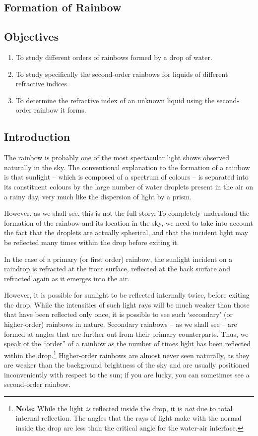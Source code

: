 \begin{refsection}
\chapter{Formation of Rainbow}

\section*{Objectives}

\begin{enumerate}
\item To study different orders of rainbows formed by a drop of water.
\item To study specifically the second-order rainbows for liquids of different refractive indices.
\item To determine the refractive index of an unknown liquid using the second-order rainbow it forms.
\end{enumerate}


\section*{Introduction}
The rainbow is probably one of the most spectacular light shows observed naturally in the sky. The conventional explanation to the formation of a rainbow is that sunlight -- which is composed of a spectrum of colours -- is separated into its constituent colours by the large number of water droplets present in the air on a rainy day, very much like the dispersion of light by a prism. 

However, as we shall see, this is not the full story. To completely understand the formation of the rainbow and its location in the sky, we need to take into account the fact that the droplets are actually spherical, and that the incident light may be reflected many times within the drop before exiting it.

In the case of a primary (or first order) rainbow, the sunlight incident on a raindrop is refracted at the front surface, reflected at the back surface and refracted again as it emerges into the air. 

However, it is possible for sunlight to be reflected internally twice, before exiting the drop. While the intensities of such light rays will be much weaker than those that have been reflected only once, it is possible to see such `secondary' (or higher-order) rainbows in nature. Secondary rainbows -- as we shall see -- are formed at angles that are further out from their primary counterparts. Thus, we speak of the ``order'' of a rainbow as the number of times light has been reflected within the drop.\footnote{\textbf{Note:} While the light \textit{is} reflected inside the drop, it is \textit{not} due to total internal reflection. The angles that the rays of light make with the normal inside the drop are less than the critical angle for the water-air interface.} Higher-order rainbows are almost never seen naturally, as they are weaker than the background brightness of the sky and are usually positioned inconveniently with respect to the sun; if you are lucky, you can sometimes see a second-order rainbow. 


\end{refsection}

